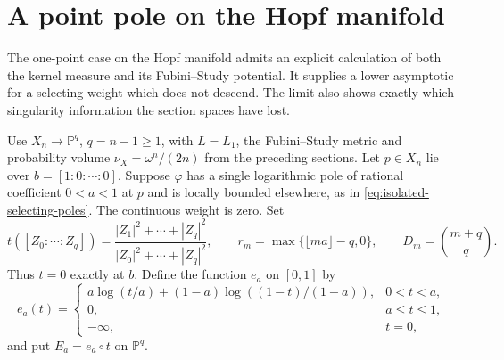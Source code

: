 \section{A point pole on the Hopf manifold}
\label{sec:hopf-point-equilibrium}

The one-point case on the Hopf manifold admits an explicit calculation of both the kernel measure and its Fubini--Study potential. It supplies a lower asymptotic for a selecting weight which does not descend. The limit also shows exactly which singularity information the section spaces have lost.

Use $X_n\to\mathbb P^q$, $q=n-1\geq1$, with $L=L_1$, the Fubini--Study metric and probability volume $\nu_X=\omega^n/(2n)$ from the preceding sections. Let $p\in X_n$ lie over $b=[1:0:\cdots:0]$. Suppose $\varphi$ has a single logarithmic pole of rational coefficient $0<a<1$ at $p$ and is locally bounded elsewhere, as in \eqref{eq:isolated-selecting-poles}. The continuous weight is zero. Set
\[
 t([Z_0:\cdots:Z_q])=
       \frac{|Z_1|^2+\cdots+|Z_q|^2}{|Z_0|^2+\cdots+|Z_q|^2},
 \qquad r_m=\max\{\lfloor ma\rfloor-q,0\},
 \qquad D_m=\binom{m+q}{q}.
\]
Thus $t=0$ exactly at $b$. Define the function $e_a$ on $[0,1]$ by
\begin{equation}\label{eq:point-equilibrium-function}
 e_a(t)=
 \begin{cases}
 a\log(t/a)+(1-a)\log((1-t)/(1-a)),&0<t<a,\\
 0,&a\leq t\leq1,\\
 -\infty,&t=0,
 \end{cases}
\end{equation}
and put $E_a=e_a\circ t$ on $\mathbb P^q$.

